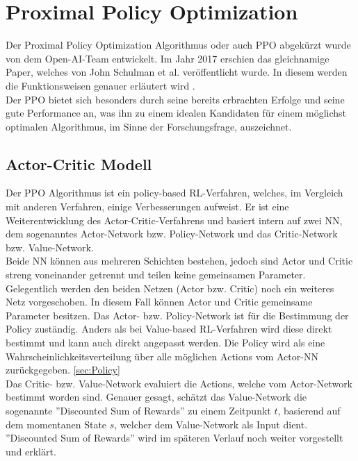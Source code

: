 \section{Proximal Policy Optimization} \label{sec:PPO}
Der Proximal Policy Optimization Algorithmus oder auch PPO abgekürzt wurde von dem Open-AI-Team entwickelt. Im Jahr 2017 erschien das gleichnamige Paper, welches von John Schulman et al. veröffentlicht wurde. In diesem werden die Funktionsweisen genauer erläutert wird \cite{PPO}.\\
Der PPO bietet sich besonders durch seine bereits erbrachten Erfolge \cite{PPO} und seine gute Performance an, was ihn zu einem idealen Kandidaten für einem möglichst optimalen Algorithmus, im Sinne der Forschungsfrage, auszeichnet.

\subsection{Actor-Critic Modell} \label{sec:actor_critic}
Der PPO Algorithmus ist ein policy-based RL-Verfahren, welches, im Vergleich mit anderen Verfahren, einige Verbesserungen aufweist. Er ist eine Weiterentwicklung des Actor-Critic-Verfahrens und basiert intern auf zwei NN, dem sogenanntes Actor-Network bzw. Policy-Network und das Critic-Network bzw. Value-Network. \cite[S. 273 f.]{Sutton1998}\\
Beide NN können aus mehreren Schichten bestehen, jedoch sind Actor und Critic streng voneinander getrennt und teilen keine gemeinsamen Parameter. Gelegentlich werden den beiden Netzen (Actor bzw. Critic) noch ein weiteres Netz vorgeschoben. In diesem Fall können Actor und Critic gemeinsame Parameter besitzen.
Das Actor- bzw. Policy-Network ist für die Bestimmung der Policy zuständig. Anders als bei Value-based RL-Verfahren wird diese direkt bestimmt und kann auch direkt angepasst werden. Die Policy wird als eine Wahrscheinlichkeitsverteilung über alle möglichen Actions vom Actor-NN zurückgegeben. \ref{sec:Policy}\\
Das Critic- bzw. Value-Network evaluiert die Actions, welche vom Actor-Network bestimmt worden sind. Genauer gesagt, schätzt das Value-Network die sogenannte ''Discounted Sum of Rewards'' zu einem Zeitpunkt $t$, basierend auf dem momentanen State $s$, welcher dem Value-Network als Input dient. ''Discounted Sum of Rewards'' wird im späteren Verlauf noch weiter vorgestellt und erklärt.

